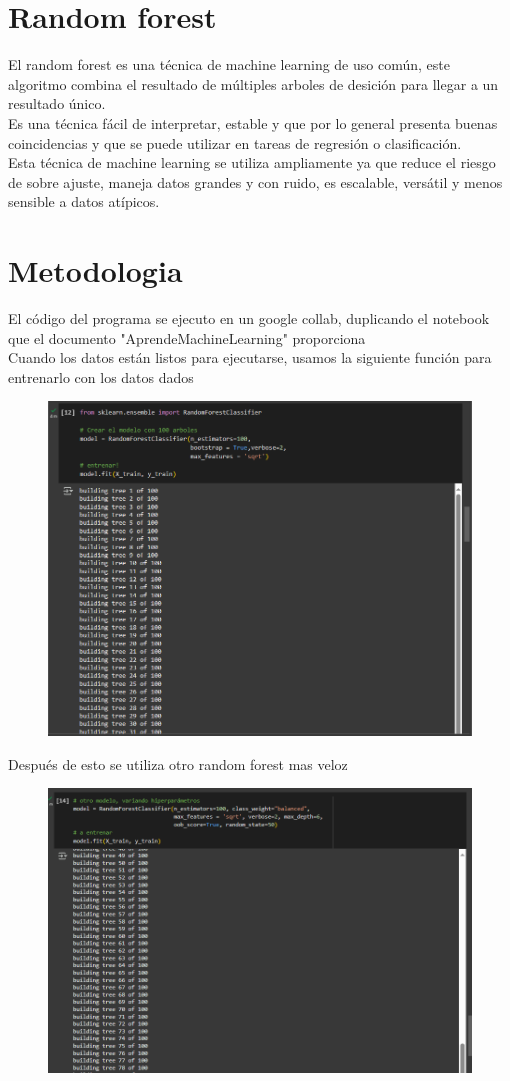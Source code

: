 \section{Random forest}
El random forest es una técnica de machine learning de uso común, este algoritmo combina el resultado de múltiples arboles de desición para llegar a un resultado único. \\
Es una técnica fácil de interpretar, estable y que por lo general presenta buenas coincidencias y que se puede utilizar en tareas de regresión o clasificación. \\
Esta técnica de machine learning se utiliza ampliamente ya que reduce el riesgo de sobre ajuste, maneja datos grandes y con ruido, es escalable, versátil y menos sensible a datos atípicos.
\section{Metodologia}
El código del programa se ejecuto en un google collab, duplicando el notebook que el documento "AprendeMachineLearning" proporciona\\
Cuando los datos están listos para ejecutarse, usamos la siguiente función para entrenarlo con los datos dados
\begin{figure}[H]
    \centering
    \includegraphics[width=0.75\linewidth]{image.png}
\end{figure}
\newpage
Después de esto se utiliza otro random forest mas veloz
\begin{figure}[H]
    \centering
    \includegraphics[width=0.5\linewidth]{image2.png}
\end{figure}

